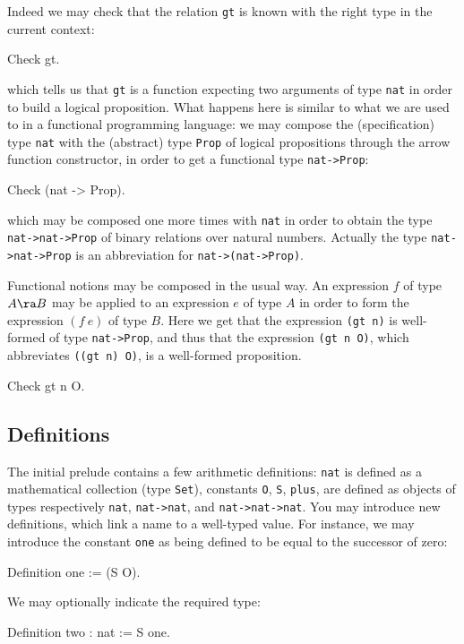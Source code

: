 \documentclass[11pt,a4paper]{book}
\begin{document}
Indeed we may check that the relation \verb:gt: is known with the right type
in the current context:

\begin{coq_example}
Check gt.
\end{coq_example}

which tells us that \verb:gt: is a function expecting two arguments of
type \verb:nat: in order to build a logical proposition.
What happens here is similar to what we are used to in a functional
programming language: we may compose the (specification) type \verb:nat:
with the (abstract) type \verb:Prop: of logical propositions through the
arrow function constructor, in order to get a functional type
\verb:nat->Prop::
\begin{coq_example}
Check (nat -> Prop).
\end{coq_example}
which may be composed one more times with \verb:nat: in order to obtain the
type \verb:nat->nat->Prop: of binary relations over natural numbers.
Actually the type \verb:nat->nat->Prop: is an abbreviation for 
\verb:nat->(nat->Prop):. 

Functional notions may be composed in the usual way. An expression $f$
of type $A\ra B$ may be applied to an expression $e$ of type $A$ in order
to form the expression $(f~e)$ of type $B$. Here we get that
the expression \verb:(gt n): is well-formed of type \verb:nat->Prop:,
and thus that the expression \verb:(gt n O):, which abbreviates
\verb:((gt n) O):, is a well-formed proposition.
\begin{coq_example}
Check gt n O.
\end{coq_example}

\subsection{Definitions}

The initial prelude contains a few arithmetic definitions:
\verb:nat: is defined as a mathematical collection (type \verb:Set:), constants
\verb:O:, \verb:S:, \verb:plus:, are defined as objects of types
respectively \verb:nat:, \verb:nat->nat:, and \verb:nat->nat->nat:.
You may introduce new definitions, which link a name to a well-typed value.
For instance, we may introduce the constant \verb:one: as being defined
to be equal to the successor of zero:
\begin{coq_example}
Definition one := (S O).
\end{coq_example}
We may optionally indicate the required type:
\begin{coq_example}
Definition two : nat := S one.
\end{coq_example}
\end{document}
